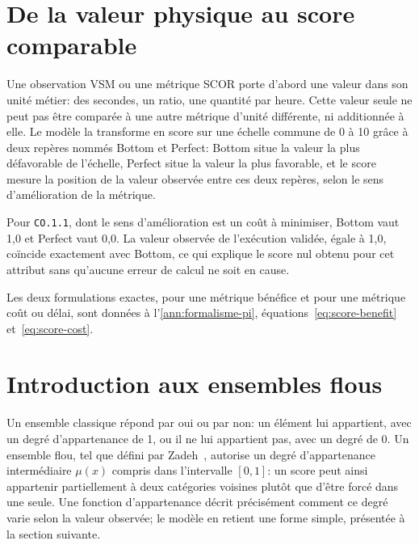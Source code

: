 \section{De la valeur physique au score comparable}

Une observation VSM ou une métrique SCOR porte d'abord une valeur dans son unité métier: des secondes, un ratio, une quantité par heure. Cette valeur seule ne peut pas être comparée à une autre métrique d'unité différente, ni additionnée à elle. Le modèle la transforme en score sur une échelle commune de 0 à 10 grâce à deux repères nommés Bottom et Perfect: Bottom situe la valeur la plus défavorable de l'échelle, Perfect situe la valeur la plus favorable, et le score mesure la position de la valeur observée entre ces deux repères, selon le sens d'amélioration de la métrique.


Pour \texttt{CO.1.1}, dont le sens d'amélioration est un coût à minimiser, Bottom vaut 1,0 et Perfect vaut 0,0. La valeur observée de l'exécution validée, égale à 1,0, coïncide exactement avec Bottom, ce qui explique le score nul obtenu pour cet attribut sans qu'aucune erreur de calcul ne soit en cause.


Les deux formulations exactes, pour une métrique bénéfice et pour une métrique coût ou délai, sont données à l'\cref{ann:formalisme-pi}, équations~\ref{eq:score-benefit} et~\ref{eq:score-cost}.

\section{Introduction aux ensembles flous}

Un ensemble classique répond par oui ou par non: un élément lui appartient, avec un degré d'appartenance de 1, ou il ne lui appartient pas, avec un degré de 0. Un ensemble flou, tel que défini par Zadeh~\cite{zadeh1965}, autorise un degré d'appartenance intermédiaire $\mu(x)$ compris dans l'intervalle $[0,1]$: un score peut ainsi appartenir partiellement à deux catégories voisines plutôt que d'être forcé dans une seule. Une fonction d'appartenance décrit précisément comment ce degré varie selon la valeur observée; le modèle en retient une forme simple, présentée à la section suivante.


